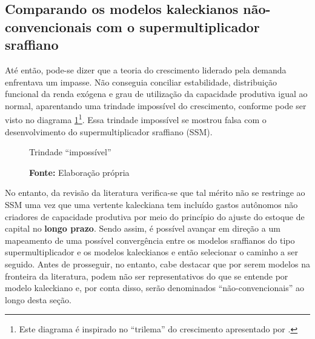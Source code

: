 \subsection{Comparando os modelos kaleckianos não-convencionais com o supermultiplicador sraffiano}
\label{Medium}

Até então, pode-se dizer que a teoria do crescimento liderado pela demanda enfrentava um impasse. Não conseguia conciliar estabilidade, distribuição funcional da renda exógena e grau de utilização da capacidade produtiva igual ao normal, aparentando uma trindade impossível do crescimento, conforme pode ser visto no diagrama \ref{diagrama}\footnote{Este diagrama é inspirado no ``trilema'' do crescimento apresentado por \textcite{cesaratto_neo-kaleckian_2015}.}.
Essa trindade impossível se mostrou falsa com o desenvolvimento do supermultiplicador sraffiano (SSM).

\begin{figure}[H]
	\caption{Trindade ``impossível''}
	\label{diagrama}
	\begin{center}
	\end{center}
	\caption*{\textbf{Fonte:} Elaboração própria}
\end{figure}
No entanto, da revisão da literatura verifica-se que tal mérito não se restringe ao SSM uma vez que uma vertente kaleckiana tem incluído gastos autônomos não criadores de capacidade produtiva por meio do princípio do ajuste do estoque de capital no \textbf{longo prazo}.
Sendo assim, é possível avançar em direção a um mapeamento de uma possível convergência entre os modelos sraffianos do tipo supermultiplicador e os modelos kaleckianos e então selecionar o caminho a ser seguido.
Antes de prosseguir, no entanto, cabe destacar que por serem modelos na fronteira da literatura, podem não ser representativos do que se entende por modelo kaleckiano e, por conta disso, serão denominados ``não-convencionais'' ao longo desta seção.

